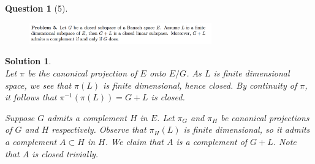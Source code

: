 \documentclass{article} %
\theoremstyle{quest}
\newtheorem*{question}{Question}
\newtheorem*{solution}{Solution}
\begin{document}
\begin{question}[5]
\hfill
\begin{figure}[h!]
  \centering
    \includegraphics[width=0.7\textwidth]{funcA-h-e2-p5.png}
\end{figure}
\end{question}
\begin{solution} \hfill \\
Let $\pi$ be the canonical projection of $E$ onto $E / G$. As $L$
is finite dimensional space, we see that $\pi(L)$ is finite dimensional, hence
closed.  
By continuity of $\pi$, it follows that $\pi^{-1}(\pi(L)) = G + L$ is closed.

\bigskip

Suppose $G$ admits a complement $H$ in $E$. Let $\pi_G$ and $\pi_H$ be canonical  
projections of $G$ and $H$ respectively. Observe that
$\pi_H(L)$ is finite dimensional, so it admits a complement $A \subset H$
in $H$. We claim that $A$ is a complement of $G + L$. Note that $A$ is closed
trivially. 



\end{solution}

\newpage
\end{document}
